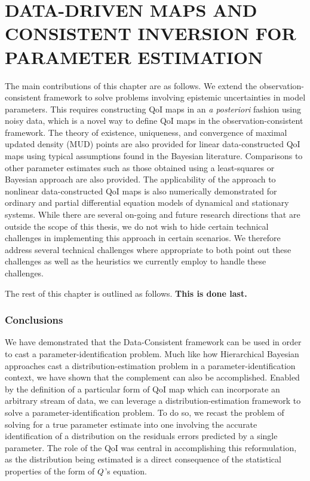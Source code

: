 \chapter{\uppercase{Data-Driven Maps and Consistent Inversion For Parameter Estimation} \label{chapter:mud}}

The main contributions of this chapter are as follows.
We extend the observation-consistent framework to solve problems involving epistemic uncertainties in model parameters.
This requires constructing QoI maps in an {\em a posteriori} fashion using noisy data, which is a novel way to define QoI maps in the observation-consistent framework.
The theory of existence, uniqueness, and convergence of maximal updated density (MUD) points are also provided for linear data-constructed QoI maps using typical assumptions found in the Bayesian literature.
Comparisons to other parameter estimates such as those obtained using a least-squares or Bayesian approach are also provided.
The applicability of the approach to nonlinear data-constructed QoI maps is also numerically demonstrated for ordinary and partial differential equation models of dynamical and stationary systems.
While there are several on-going and future research directions that are outside the scope of this thesis, we do not wish to hide certain technical challenges in implementing this approach in certain scenarios.
We therefore address several technical challenges where appropriate to both point out these challenges as well as the heuristics we currently employ to handle these challenges.


The rest of this chapter is outlined as follows.
{\bf This is done last.}



\subsection{Conclusions}\label{sec:conclusions}
We have demonstrated that the Data-Consistent framework can be used in order to cast a parameter-identification problem.
Much like how Hierarchical Bayesian approaches cast a distribution-estimation problem in a parameter-identification context, we have shown that the complement can also be accomplished.
Enabled by the definition of a particular form of QoI map which can incorporate an arbitrary stream of data, we can leverage a distribution-estimation framework to solve a parameter-identification problem.
To do so, we recast the problem of solving for a true parameter estimate into one involving the accurate identification of a distribution on the residuals errors predicted by a single parameter.
The role of the QoI was central in accomplishing this reformulation, as the distribution being estimated is a direct consequence of the statistical properties of the form of $Q$'s equation.

